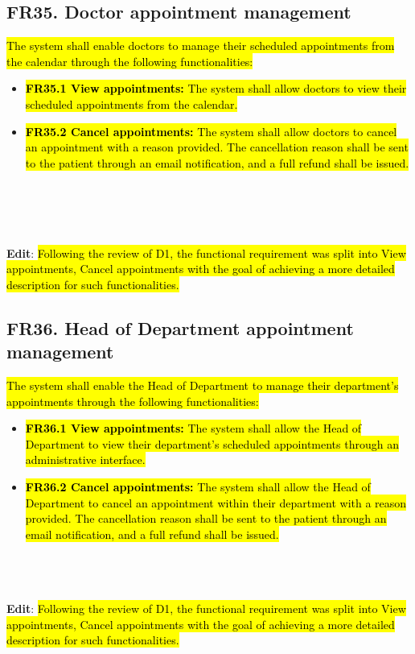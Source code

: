 \documentclass[12pt, a4paper]{article}
\begin{document}
\subsection{FR35. Doctor appointment management} \label{FR35}
\hl{The system shall enable doctors to manage their scheduled appointments from the calendar through the following functionalities:}
\begin{itemize}
    \item \hl{\textbf{FR35.1 View appointments:} The system shall allow doctors to view their scheduled appointments from the calendar.}
    \item \hl{\textbf{FR35.2 Cancel appointments:} The system shall allow doctors to cancel an appointment with a reason provided. The cancellation reason shall be sent to the patient through an email notification, and a full refund shall be issued.}
\end{itemize}
\\ 
\\ 
\\
\\ \textbf{Edit}:
\hl{Following the review of D1, the functional requirement was split into View appointments, Cancel appointments with the goal of achieving a more detailed description for such functionalities.}

\subsection{FR36. Head of Department appointment management} \label{FR36}
\hl{The system shall enable the Head of Department to manage their department's appointments through the following functionalities:}
\begin{itemize}
    \item \hl{\textbf{FR36.1 View appointments:} The system shall allow the Head of Department to view their department's scheduled appointments through an administrative interface.}
    \item \hl{\textbf{FR36.2 Cancel appointments:} The system shall allow the Head of Department to cancel an appointment within their department with a reason provided. The cancellation reason shall be sent to the patient through an email notification, and a full refund shall be issued.}
\end{itemize}
\\ 
\\
\\ \textbf{Edit}:
\hl{Following the review of D1, the functional requirement was split into View appointments, Cancel appointments with the goal of achieving a more detailed description for such functionalities.}
\end{document}

